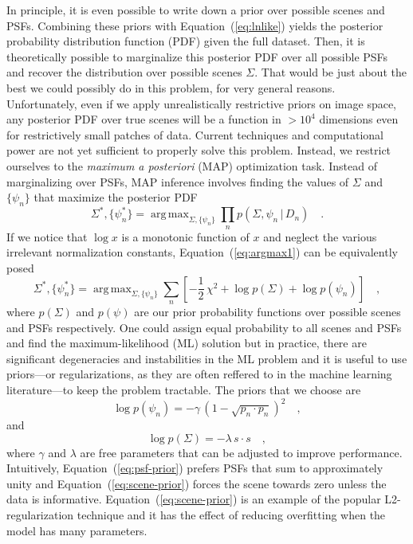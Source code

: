 \documentclass[12pt,preprint]{aastex}
\newcommand{\Eq}[1]{Equation~(\ref{eq:#1})}
\newcommand{\eq}[1]{\Eq{#1}}
\newcommand{\eqlabel}[1]{\label{eq:#1}}
\newcommand{\given}{\,|\,}
\DeclareMathOperator*{\argmax}{arg\,max}
\newcommand{\data}{\ensuremath{D}}
\newcommand{\scene}{\ensuremath{\Sigma}}
\newcommand{\psf}{\ensuremath{\psi}}
\newcommand{\svec}{\ensuremath{s}}
\newcommand{\pvec}{\ensuremath{p}}
\begin{document}
In principle, it is even possible to write down a prior over possible
scenes and PSFs. Combining these priors with \eq{lnlike} yields the
posterior probability distribution function (PDF) given the full dataset.
Then, it is theoretically possible to marginalize this posterior PDF
over all possible PSFs and recover the distribution over possible
scenes $\scene$. That would be just about the best we could possibly do
in this problem, for very general reasons.
Unfortunately, even if we apply unrealistically restrictive priors on
image space, any posterior PDF over true scenes will be a function in
$> 10^4$ dimensions even for restrictively small patches of data.
Current techniques and computational power are not yet sufficient
to properly solve this problem. Instead, we restrict ourselves to the
\emph{maximum a posteriori} (MAP) optimization task. Instead of
marginalizing over PSFs, MAP inference involves finding the values of
$\scene$ and $\{\psf_n\}$ that maximize the posterior PDF
\begin{equation}\eqlabel{argmax1}
    \scene^*, \{\psf^*_n\} = \argmax_{\scene, \{\psf_n\}}
        \prod_n p ( \scene, \psf_n \given \data_n) \quad.
\end{equation}
If we notice that $\log x$ is a monotonic function of $x$ and neglect
the various irrelevant normalization constants, \eq{argmax1} can be
equivalently posed
\begin{equation}\eqlabel{argmax1}
    \scene^*, \{\psf^*_n\} = \argmax_{\scene, \{\psf_n\}}
        \sum_n \left [ -\frac{1}{2} \, \chi^2
            + \log p (\scene) + \log p (\psf_n)
        \right ] \quad ,
\end{equation}
where $p (\scene)$ and $p(\psf)$ are our prior probability functions
over possible scenes and PSFs respectively. One could assign equal
probability to all scenes and PSFs and find the maximum-likelihood (ML)
solution but in practice, there are significant degeneracies and
instabilities in the ML problem and it is useful to use priors---or
regularizations, as they are often reffered to in the machine learning
literature---to keep the problem tractable. The priors that we choose
are
\begin{equation}\eqlabel{psf-prior}
    \log p(\psf_n) = - \gamma \, \left ( 1 - \sqrt{\pvec_n \cdot \pvec_n}
        \right )^2 \quad,
\end{equation}
and
\begin{equation}\eqlabel{scene-prior}
    \log p(\scene) = - \lambda \, \svec \cdot \svec \quad,
\end{equation}
where $\gamma$ and $\lambda$ are free parameters that can be adjusted
to improve performance. Intuitively, \eq{psf-prior} prefers PSFs that sum
to approximately unity and \eq{scene-prior} forces the scene towards zero
unless the data is informative. \Eq{scene-prior} is an example of the
popular L2-regularization technique and it has the effect of reducing
overfitting when the model has many parameters.
\end{document}
